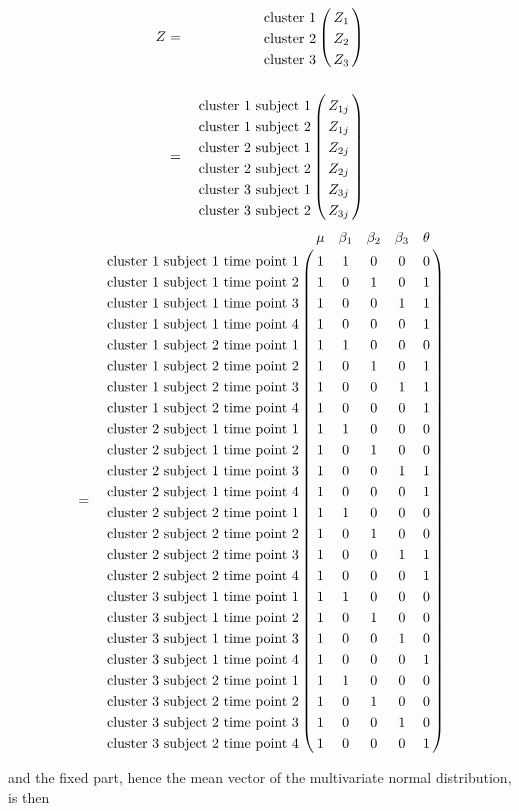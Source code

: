 \documentclass{article}
\begin{document}
\begin{eqnarray*}
Z&=&\bordermatrix{
  					& \cr
\textrm{cluster 1} 	& Z_{1}\cr
\textrm{cluster 2}	&Z_{2} 		\cr
\textrm{cluster 3}  &Z_{3} 		\cr
}\\
&=&\bordermatrix{
  					& \cr
\textrm{cluster 1 subject 1} 	& Z_{1j}\cr
\textrm{cluster 1 subject 2}	&Z_{1j} 		\cr
\textrm{cluster 2 subject 1} 	& Z_{2j}\cr
\textrm{cluster 2 subject 2}	&Z_{2j} 		\cr
\textrm{cluster 3 subject 1}   & Z_{3j}\cr
\textrm{cluster 3 subject 2}	&Z_{3j} 		\cr
}
\end{eqnarray*}
\begin{eqnarray*}
&=&  \bordermatrix{
  						& \mu	&\beta_{1}	& \beta_{2}	& \beta_{3}&\theta\cr
\textrm{cluster 1 subject 1 time point 1} 	& 1		&1			&0		 	& 0 & 0\cr
\textrm{cluster 1 subject 1 time point 2} 	&1 		&0 			&1			& 0 & 1\cr
\textrm{cluster 1 subject 1 time point 3}	&1 		&0			&0			& 1& 1\cr
\textrm{cluster 1 subject 1 time point 4}  &1 		&0			&0		&0	& 1\cr
\textrm{cluster 1 subject 2 time point 1} 	& 1		&1			&0		&0 	& 0\cr
\textrm{cluster 1 subject 2 time point 2} 	&1 		&0 			&1		&0	& 1\cr
\textrm{cluster 1 subject 2 time point 3}	&1 		&0			&0			& 1& 1\cr
\textrm{cluster 1 subject 2 time point 4}  &1 		&0			&0		&0	& 1\cr
\textrm{cluster 2 subject 1 time point 1} 	& 1		&1			&0		 	& 0& 0\cr
\textrm{cluster 2 subject 1 time point 2} 	&1 		&0 			&1			& 0& 0\cr
\textrm{cluster 2 subject 1 time point 3}	&1 		&0			&0		& 1	& 1\cr
\textrm{cluster 2 subject 1 time point 4}  &1 		&0			&0		& 0	& 1\cr
\textrm{cluster 2 subject 2 time point 1} 	& 1		&1			&0		 	& 0& 0\cr
\textrm{cluster 2 subject 2 time point 2} 	&1 		&0 			&1			& 0& 0\cr
\textrm{cluster 2 subject 2 time point 3}	&1 		&0			&0			& 1& 1\cr
\textrm{cluster 2 subject 2 time point 4}  &1 		&0			&0		& 0	& 1\cr
\textrm{cluster 3 subject 1 time point 1}   & 1		&1			&0		 	& 0& 0\cr
\textrm{cluster 3 subject 1 time point 2} 	&1 		&0 			&1			& 0& 0\cr
\textrm{cluster 3 subject 1 time point 3}	&1 		&0			&0		& 1	& 0\cr
\textrm{cluster 3 subject 1 time point 4}  &1 		&0			&0		& 0	& 1\cr
\textrm{cluster 3 subject 2 time point 1} 	& 1		&1			&0		 	& 0& 0\cr
\textrm{cluster 3 subject 2 time point 2} 	&1 		&0 			&1			& 0& 0\cr
\textrm{cluster 3 subject 2 time point 3}	&1 		&0			&0			& 1& 0\cr
\textrm{cluster 3 subject 2 time point 4}  &1 		&0			&0		& 0	& 1\cr
}
\end{eqnarray*}


and the fixed part, hence the mean vector of the multivariate normal distribution, is then
\end{document}
